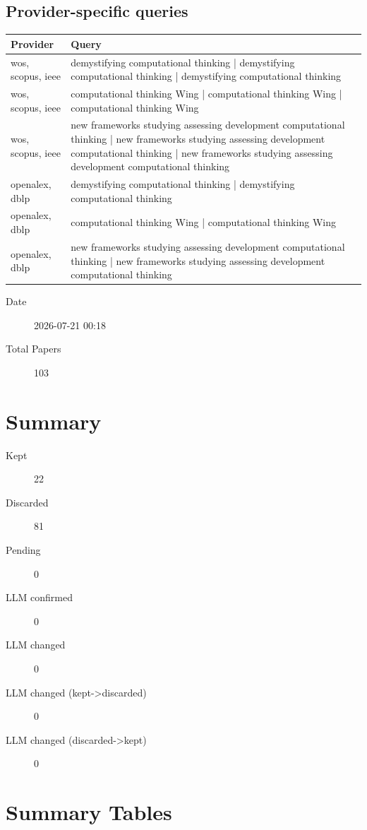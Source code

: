 \documentclass{article}
\begin{document}
\subsection{Provider-specific queries}
\begin{longtable}{lp{10cm}}
\toprule
Provider & Query \\
\midrule
wos, scopus, ieee & demystifying computational thinking | demystifying computational thinking | demystifying computational thinking \\
wos, scopus, ieee & computational thinking Wing | computational thinking Wing | computational thinking Wing \\
wos, scopus, ieee & new frameworks studying assessing development computational thinking | new frameworks studying assessing development computational thinking | new frameworks studying assessing development computational thinking \\
openalex, dblp & demystifying computational thinking | demystifying computational thinking \\
openalex, dblp & computational thinking Wing | computational thinking Wing \\
openalex, dblp & new frameworks studying assessing development computational thinking | new frameworks studying assessing development computational thinking \\
\bottomrule
\end{longtable}

\begin{description}
\item[Date] 2026-07-21 00:18
\item[Total Papers] 103
\end{description}

\section{Summary}
\begin{description}
\item[Kept] 22
\item[Discarded] 81
\item[Pending] 0
\item[LLM confirmed] 0
\item[LLM changed] 0
\item[LLM changed (kept->discarded)] 0
\item[LLM changed (discarded->kept)] 0
\end{description}

\section{Summary Tables}
\end{document}
